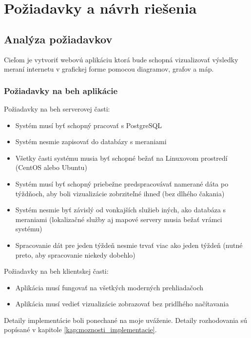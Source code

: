 \chapter{Požiadavky a návrh riešenia}

\label{kap:navrh_riesenia}

\section{Analýza požiadavkov}

Cieľom je vytvoriť webovú aplikáciu ktorá bude schopná vizualizovať výsledky meraní internetu v grafickej forme pomocou diagramov, 
grafov a máp. 

\subsection{Požiadavky na beh aplikácie}

Požiadavky na beh serverovej časti:
\begin{itemize}
    \item Systém musí byť schopný pracovať s PostgreSQL
    \item Systém nesmie zapisovať do databázy s meraniami
    \item Všetky časti systému musia byť schopné bežať na Linuxovom prostredí (CentOS alebo Ubuntu)
    \item Systém musí byť schopný priebežne predspracovávať namerané dáta po týždňoch, 
    aby boli vizualizácie zobrziteľné ihneď (bez dlhého čakania)
    \item Systém nesmie byť závislý od vonkajších služieb iných, ako databáza s meraniami 
    (lokalizačné služby aj mapové servery musia bežať vrámci systému)
    \item Spracovanie dát pre jeden týždeň nesmie trvať viac ako jeden týždeň (nutné preto, aby spracovanie niekedy dobehlo)
\end{itemize}
Požiadavky na beh klientskej časti:
\begin{itemize}
    \item Aplikácia musí fungovať na všetkých moderných prehliadačoch
    \item Aplikácia musí vedieť vizualizácie zobrazovať bez pridlhého načítavania
\end{itemize}

Detaily implementácie boli ponechané na moje uváženie. Detaily rozhodovania sú popísané v kapitole \ref{kap:moznosti_implementacie}.


